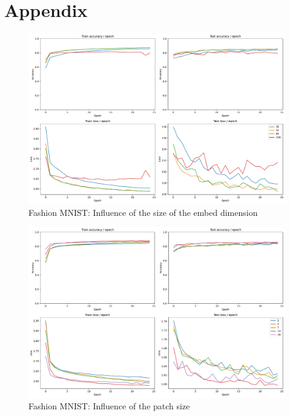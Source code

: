 \chapter{Appendix}

\begin{figure}[H]
    \centering
    \includegraphics*[width=\textwidth]{figs/Transformers/fashion-MNIST/embed_dim_influence_25.pdf}
    \caption{Fashion MNIST: Influence of the size of the embed dimension}
    \label{fig:fashion:embed_dim_influence}
\end{figure}

\begin{figure}[H]
    \centering
    \includegraphics*[width=\textwidth]{figs/Transformers/fashion-MNIST/patch_size_influence_25.pdf}
    \caption{Fashion MNIST: Influence of the patch size}
    \label{fig:fashion:patch_size_influence}
\end{figure}

